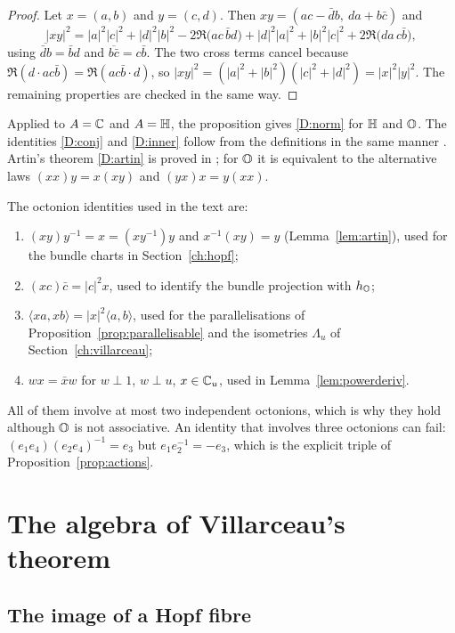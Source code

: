 \begin{proof}
Let $x=(a,b)$ and $y=(c,d)$. Then $xy=(ac-\bar db,\ da+b\bar c)$ and
\[
|xy|^2=|a|^2|c|^2+|d|^2|b|^2-2\Re\bigl(ac\,\bar b d\bigr)+|d|^2|a|^2+|b|^2|c|^2+2\Re\bigl(da\,c\bar b\bigr),
\]
using $\overline{\bar db}=\bar bd$ and $\overline{b\bar c}=c\bar b$. The two cross terms cancel because $\Re(d\cdot ac\bar b)=\Re(ac\bar b\cdot d)$, so $|xy|^2=(|a|^2+|b|^2)(|c|^2+|d|^2)=|x|^2|y|^2$. The remaining properties are checked in the same way.
\end{proof}

Applied to $A=\mathbb{C}$ and $A=\mathbb{H}$, the proposition gives \ref{D:norm} for $\mathbb{H}$ and $\mathbb{O}$. The identities \ref{D:conj} and \ref{D:inner} follow from the definitions in the same manner \cite[Chapter~III]{Sch66}. Artin's theorem \ref{D:artin} is proved in \cite[Theorem~3.1]{Sch66}; for $\mathbb{O}$ it is equivalent to the alternative laws $(xx)y=x(xy)$ and $(yx)x=y(xx)$.

The octonion identities used in the text are:
\begin{enumerate}[label=(O\arabic*)]
\item $(xy)y^{-1}=x=(xy^{-1})y$ and $x^{-1}(xy)=y$ (Lemma~\ref{lem:artin}), used for the bundle charts in Section~\ref{ch:hopf};
\item $(xc)\bar c=|c|^2x$, used to identify the bundle projection with $h_{\mathbb{O}}$;
\item $\langle xa,xb\rangle=|x|^2\langle a,b\rangle$, used for the parallelisations of Proposition~\ref{prop:parallelisable} and the isometries $\Lambda_u$ of Section~\ref{ch:villarceau};
\item $wx=\bar xw$ for $w\perp1$, $w\perp u$, $x\in\mathbb{C}_u$, used in Lemma~\ref{lem:powerderiv}.
\end{enumerate}
All of them involve at most two independent octonions, which is why they hold although $\mathbb{O}$ is not associative. An identity that involves three octonions can fail: $(e_1e_4)(e_2e_4)^{-1}=e_3$ but $e_1e_2^{-1}=-e_3$, which is the explicit triple of Proposition~\ref{prop:actions}.

\section{The algebra of Villarceau's theorem}\label{app:villarceau}

\subsection{The image of a Hopf fibre}

